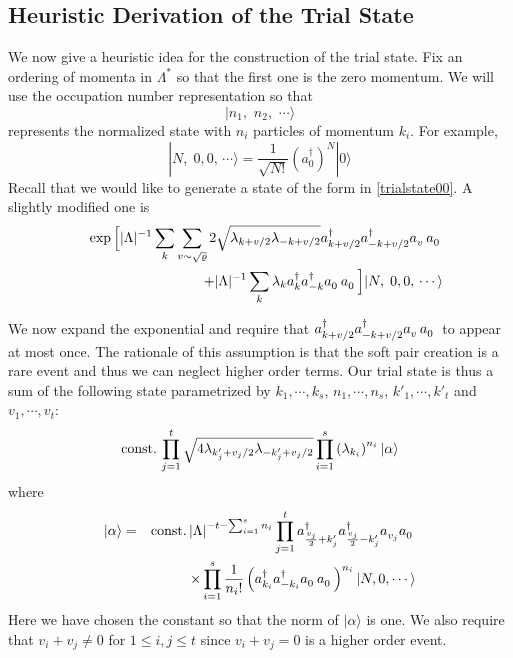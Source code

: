 \documentclass[11pt]{article}
\numberwithin{equation}{section}
\newcommand{\ann}{a^{\hphantom{+}}}
\newcommand{\cre}{a^{\dagger}}
\newcommand{\beq}{\begin{equation}}
\newcommand{\eeq}{\end{equation}}
\newcommand{\beqa}{\begin{eqnarray}}
\newcommand{\eeqa}{\end{eqnarray}}
\newcommand\Z{{\mathbb Z}}
\newcommand\const{{\rm const.\, }}
\newcommand\al{{\alpha}}
\renewcommand\rho\varrho
\theoremstyle{definition}
\begin{document}
\subsection{Heuristic Derivation of the Trial State}

We now give a heuristic idea for the construction of  the trial state. Fix an ordering of momenta in $\Lambda^*$ so that the first one 
is the zero momentum.  We will  use the occupation number representation so that 
\beq
|n_1,\,\,n_2,\,\,\cdots\rangle
\eeq
represents the normalized state with  $n_i$ particles of momentum $k_i$. For example, 
\[
|N,\; 0, 0 ,\,\cdots\rangle = \frac 1 { \sqrt {N!}}( \cre_0)^N |0\rangle 
\]
Recall that we would like to generate a state of the form in \eqref{trialstate00}. A slightly modified one is 
\beqa\label{trialstate001}
&& \exp \Big  [ |\Lambda|^{-1}  \sum_k \sum_{v \sim \sqrt \rho }  2 \sqrt {\lambda_{k+v/2}  \lambda_{-k+v/2}} \cre_{k+v/2}\cre_{-k+v/2}\ann_v\ann_0   \nonumber \\ 
&& + |\Lambda|^{-1} \sum_k  {\lambda_k}  \cre_k\cre_{-k}\ann_0\ann_0   \Big  ] |N,\; 0, 0 ,\,\cdots\rangle
\eeqa

We now expand the exponential and require that $\cre_{k+v/2}\cre_{-k+v/2}\ann_v\ann_0$ to  appear at most once. 
The rationale of this assumption is that the soft pair creation is a rare event and thus we can neglect higher order terms.  
Our trial state is thus a sum  of the following  state parametrized by  $k_1,\cdots,k_s$, $n_1,\cdots,n_s$, $k'_1,\cdots,k'_t$
and $v_1,\cdots,v_t$: 
\beq\label{defmn}
 \const \prod_{j=1}^t    \sqrt { 4 \lambda_{k'_j+v_j/2}  \lambda_{-k'_j+v_j/2}}  \prod_{i=1}^s\left(\lambda_{k_i} \right)^{n_i} |\al\rangle
\eeq
where 
\beqa
|\al\rangle = && \const |\Lambda|^{-t-\sum_{i=1}^s n_i}  \prod_{j=1}^t    \cre_{\frac{v_j}{2}+k'_j}\cre_{\frac{v_j}{2}-k'_j}\ann_{v_j}  \ann_0  \nonumber   \\
&& \times \prod_{i=1}^s   \frac 1 {n_i !} \left ( \cre_{k_i}\cre_{-k_i}\ann_{0}\ann_0\right)^{n_i}|N,0,\cdots\rangle
\eeqa
Here we have chosen the constant so that the norm of $|\al\rangle$ is one. 
We  also require that  $v_i+v_j\neq0$ for $1\leq i,j\leq t$ since $v_i+v_j= 0$  is a higher order event. 
\end{document}
